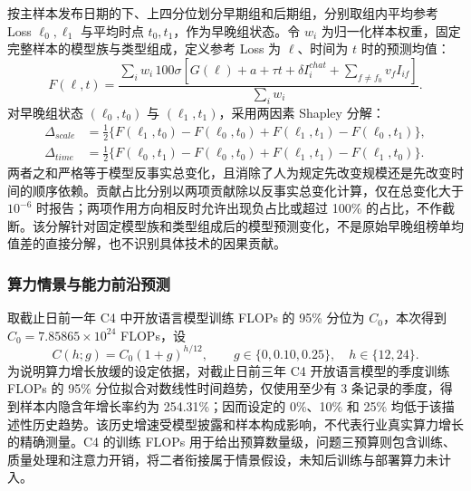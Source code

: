 \documentclass[bwprint]{gmcmthesis}
\numberwithin{equation}{section}
\numberwithin{figure}{section}
\numberwithin{table}{section}
\begin{document}
        按主样本发布日期的下、上四分位划分早期组和后期组，分别取组内平均参考 Loss $\ell_0,\ell_1$ 与平均时点 $t_0,t_1$，作为早晚组状态。令 $w_i$ 为归一化样本权重，固定完整样本的模型族与类型组成，定义参考 Loss 为 $\ell$、时间为 $t$ 时的预测均值：
        \begin{equation}
        F(\ell,t)=\frac{\sum_i w_i\,100\sigma\!\left[G(\ell)+a+\tau t+\delta I_i^{chat}+\sum_{f\ne f_0}v_fI_{if}\right]}{\sum_i w_i}.
        \label{eq:p4_counterfactual_mean}
        \end{equation}
        对早晚组状态 $(\ell_0,t_0)$ 与 $(\ell_1,t_1)$，采用两因素 Shapley 分解：
        \begin{equation}
        \begin{aligned}
        \Delta_{scale}&=\tfrac12\{F(\ell_1,t_0)-F(\ell_0,t_0)+F(\ell_1,t_1)-F(\ell_0,t_1)\},\\
        \Delta_{time}&=\tfrac12\{F(\ell_0,t_1)-F(\ell_0,t_0)+F(\ell_1,t_1)-F(\ell_1,t_0)\}.
        \end{aligned}
        \label{eq:p4_shapley}
        \end{equation}
        两者之和严格等于模型反事实总变化，且消除了人为规定先改变规模还是先改变时间的顺序依赖。贡献占比分别以两项贡献除以反事实总变化计算，仅在总变化大于 $10^{-6}$ 时报告；两项作用方向相反时允许出现负占比或超过 100\% 的占比，不作截断。该分解针对固定模型族和类型组成后的模型预测变化，不是原始早晚组榜单均值差的直接分解，也不识别具体技术的因果贡献。

        \subsubsection{算力情景与能力前沿预测}
        取截止日前一年 C4 中开放语言模型训练 FLOPs 的 95\% 分位为 $C_0$，本次得到 $C_0=7.85865\times10^{24}$ FLOPs，设
        \begin{equation}
        C(h;g)=C_0(1+g)^{h/12},\qquad g\in\{0,0.10,0.25\},\quad h\in\{12,24\}.
        \label{eq:p4_compute_path}
        \end{equation}
        为说明算力增长放缓的设定依据，对截止日前三年 C4 开放语言模型的季度训练 FLOPs 的 95\% 分位拟合对数线性时间趋势，仅使用至少有 3 条记录的季度，得到样本内隐含年增长率约为 254.31\%；因而设定的 0\%、10\% 和 25\% 均低于该描述性历史趋势。该历史增速受模型披露和样本构成影响，不代表行业真实算力增长的精确测量。C4 的训练 FLOPs 用于给出预算数量级，问题三预算则包含训练、质量处理和注意力开销，将二者衔接属于情景假设，未知后训练与部署算力未计入。
\end{document}
